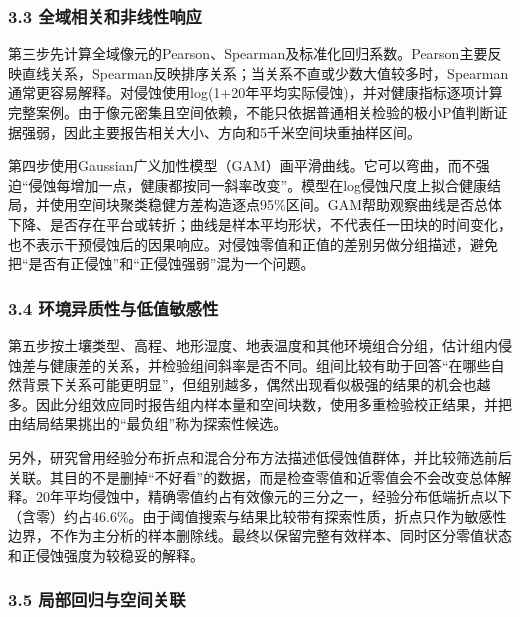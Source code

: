 \documentclass[
  10.5pt,
]{article}
\begin{document}
\hypertarget{ux5168ux57dfux76f8ux5173ux548cux975eux7ebfux6027ux54cdux5e94}{%
\subsubsection{3.3
全域相关和非线性响应}\label{ux5168ux57dfux76f8ux5173ux548cux975eux7ebfux6027ux54cdux5e94}}

第三步先计算全域像元的Pearson、Spearman及标准化回归系数。Pearson主要反映直线关系，Spearman反映排序关系；当关系不直或少数大值较多时，Spearman通常更容易解释。对侵蚀使用log(1+20年平均实际侵蚀)，并对健康指标逐项计算完整案例。由于像元密集且空间依赖，不能只依据普通相关检验的极小P值判断证据强弱，因此主要报告相关大小、方向和5千米空间块重抽样区间。

第四步使用Gaussian广义加性模型（GAM）画平滑曲线。它可以弯曲，而不强迫``侵蚀每增加一点，健康都按同一斜率改变''。模型在log侵蚀尺度上拟合健康结局，并使用空间块聚类稳健方差构造逐点95\%区间。GAM帮助观察曲线是否总体下降、是否存在平台或转折；曲线是样本平均形状，不代表任一田块的时间变化，也不表示干预侵蚀后的因果响应。对侵蚀零值和正值的差别另做分组描述，避免把``是否有正侵蚀''和``正侵蚀强弱''混为一个问题。

\hypertarget{ux73afux5883ux5f02ux8d28ux6027ux4e0eux4f4eux503cux654fux611fux6027}{%
\subsubsection{3.4
环境异质性与低值敏感性}\label{ux73afux5883ux5f02ux8d28ux6027ux4e0eux4f4eux503cux654fux611fux6027}}

第五步按土壤类型、高程、地形湿度、地表温度和其他环境组合分组，估计组内侵蚀差与健康差的关系，并检验组间斜率是否不同。组间比较有助于回答``在哪些自然背景下关系可能更明显''，但组别越多，偶然出现看似极强的结果的机会也越多。因此分组效应同时报告组内样本量和空间块数，使用多重检验校正结果，并把由结局结果挑出的``最负组''称为探索性候选。

另外，研究曾用经验分布折点和混合分布方法描述低侵蚀值群体，并比较筛选前后关联。其目的不是删掉``不好看''的数据，而是检查零值和近零值会不会改变总体解释。20年平均侵蚀中，精确零值约占有效像元的三分之一，经验分布低端折点以下（含零）约占46.6\%。由于阈值搜索与结果比较带有探索性质，折点只作为敏感性边界，不作为主分析的样本删除线。最终以保留完整有效样本、同时区分零值状态和正侵蚀强度为较稳妥的解释。

\hypertarget{ux5c40ux90e8ux56deux5f52ux4e0eux7a7aux95f4ux5173ux8054}{%
\subsubsection{3.5
局部回归与空间关联}\label{ux5c40ux90e8ux56deux5f52ux4e0eux7a7aux95f4ux5173ux8054}}
\end{document}

